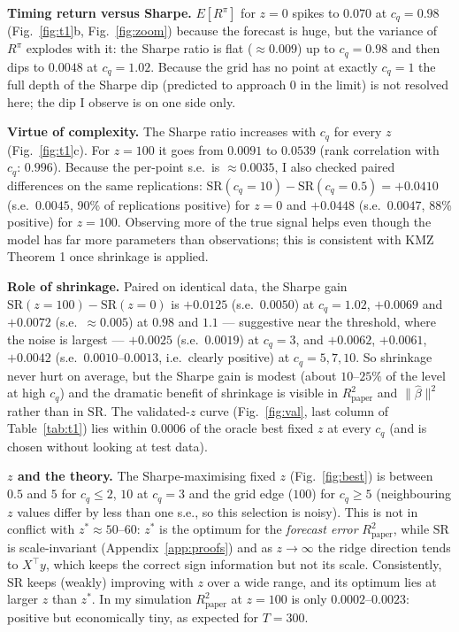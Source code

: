 \documentclass[11pt,a4paper]{article}
\newcommand{\bh}{\widehat{\beta}}
\newcommand{\Rpaper}{R^2_{\mathrm{paper}}}
\newcommand{\SR}{\mathrm{SR}}
\begin{document}
\textbf{Timing return versus Sharpe.} $E[R^\pi]$ for $z=0$ spikes to $0.070$ at $c_q=0.98$ (Fig.~\ref{fig:t1}b, Fig.~\ref{fig:zoom}) because the forecast is huge, but the variance of $R^\pi$ explodes with it: the Sharpe ratio is flat ($\approx0.009$) up to $c_q=0.98$ and then dips to $0.0048$ at $c_q=1.02$.
Because the grid has no point at exactly $c_q=1$ the full depth of the Sharpe dip (predicted to approach $0$ in the limit) is not resolved here; the dip I observe is on one side only.

\textbf{Virtue of complexity.} The Sharpe ratio increases with $c_q$ for every $z$ (Fig.~\ref{fig:t1}c). For $z=100$ it goes from $0.0091$ to $0.0539$ (rank correlation with $c_q$: $0.996$).
Because the per-point s.e.\ is $\approx0.0035$, I also checked paired differences on the same replications: $\SR(c_q{=}10)-\SR(c_q{=}0.5)=+0.0410$ (s.e.\ $0.0045$, 90\% of replications positive) for $z=0$ and $+0.0448$ (s.e.\ $0.0047$, 88\% positive) for $z=100$.
Observing more of the true signal helps even though the model has far more parameters than observations; this is consistent with KMZ Theorem 1 once shrinkage is applied.

\textbf{Role of shrinkage.} Paired on identical data, the Sharpe gain $\SR(z{=}100)-\SR(z{=}0)$ is $+0.0125$ (s.e.\ $0.0050$) at $c_q=1.02$, $+0.0069$ and $+0.0072$ (s.e.\ $\approx0.005$) at $0.98$ and $1.1$ --- suggestive near the threshold, where the noise is largest ---
$+0.0025$ (s.e.\ $0.0019$) at $c_q=3$, and $+0.0062$, $+0.0061$, $+0.0042$ (s.e.\ $0.0010$--$0.0013$, i.e.\ clearly positive) at $c_q=5,7,10$.
So shrinkage never hurt on average, but the Sharpe gain is modest (about $10$--$25\%$ of the level at high $c_q$) and the dramatic benefit of shrinkage is visible in $\Rpaper$ and $\|\bh\|^2$ rather than in $\SR$.
The validated-$z$ curve (Fig.~\ref{fig:val}, last column of Table~\ref{tab:t1}) lies within $0.0006$ of the oracle best fixed $z$ at every $c_q$ (and is chosen without looking at test data).

\textbf{$z$ and the theory.} The Sharpe-maximising fixed $z$ (Fig.~\ref{fig:best}) is between $0.5$ and $5$ for $c_q\le2$, $10$ at $c_q=3$ and the grid edge ($100$) for $c_q\ge5$ (neighbouring $z$ values differ by less than one s.e., so this selection is noisy). This is not in conflict with $z^*\approx50$--$60$: $z^*$ is the optimum for the \emph{forecast error} $\Rpaper$, while $\SR$ is scale-invariant (Appendix~\ref{app:proofs}) and as $z\to\infty$ the ridge direction tends to $X^\top y$, which keeps the correct sign information but not its scale.
Consistently, $\SR$ keeps (weakly) improving with $z$ over a wide range, and its optimum lies at larger $z$ than $z^*$. In my simulation $\Rpaper$ at $z=100$ is only $0.0002$--$0.0023$: positive but economically tiny, as expected for $T=300$.
\end{document}
